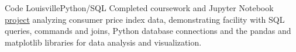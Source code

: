 {Code Louisville}{Python/SQL}
{Completed coursework and Jupyter Notebook \href{https://github.com/jacobarchambault/cpi-python}{project} analyzing consumer price index data, demonstrating facility with SQL queries, commands and joins, 
	Python database connections and the pandas and matplotlib libraries for data analysis and visualization.}
